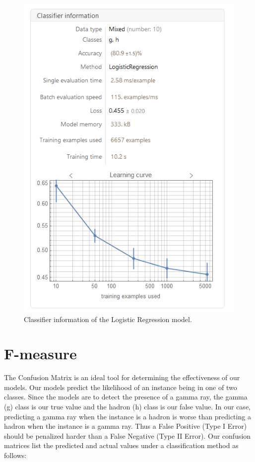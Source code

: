 \documentclass[a4paper, 12pt]{report}
\theoremstyle{definition}
\begin{document}
\begin{figure}[p]
  \centering
  \includegraphics[scale=0.75]{models/lr1.png}
  \caption{Classifier information of the Logistic Regression model.}
\end{figure}

\newpage

\section{F-measure}

The Confusion Matrix is an ideal tool for determining the effectiveness of our models. Our models predict the likelihood of an instance being in one of two classes. Since the models are to detect the presence of a gamma ray, the gamma (g) class is our true value and the hadron (h) class is our false value. In our case, predicting a gamma ray when the instance is a hadron is worse than predicting a hadron when the instance is a gamma ray. Thus a False Positive (Type I Error) should be penalized harder than a False Negative (Type II Error). Our confusion matrices list the predicted and actual values under a classification method as follows:
\end{document}
